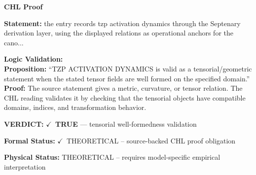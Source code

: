 \vspace{0.45em}
\noindent\textbf{CHL Proof}\par
\textbf{Statement:} the entry records tzp activation dynamics through the Septenary derivation layer, using
the displayed relations as operational anchors for the cano...

\textbf{Logic Validation:}\\
\textbf{Proposition:} ``TZP ACTIVATION DYNAMICS is valid as a tensorial/geometric statement when the stated
tensor fields are well formed on the specified domain.''\\
\textbf{Proof:} The source statement gives a metric, curvature, or tensor relation. The CHL reading
validates it by checking that the tensorial objects have compatible domains, indices,
and transformation behavior.

\textbf{VERDICT:} \ensuremath{\checkmark}\ \textbf{TRUE} --- tensorial well-formedness validation

\textbf{Formal Status:} \ensuremath{\checkmark}\ THEORETICAL -- source-backed CHL proof obligation

\textbf{Physical Status:} THEORETICAL -- requires model-specific empirical interpretation
\par\vspace{0.45em}
\par
\ifTZPDarkEdition
{}
\fi
\endgroup
\endgroup
